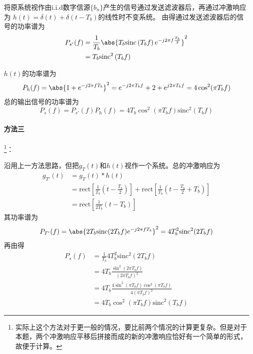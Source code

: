     将原系统视作由i.i.d数字信源$\{b_n\}$产生的信号通过发送滤波器后，再通过冲激响应为
    $h(t)=\delta(t)+\delta(t-T_b)$的线性时不变系统。
    由得通过发送滤波器后的信号的功率谱为
    \begin{equation}
        \begin{split}
            P_{s'}(f)   &=\frac{1}{T_b}\abs{T_b\text{sinc}\left(T_bf\right)e^{-j2\pi f\frac{T_b}{2}}}^2\\
                        &=T_b\text{sinc}^2\left(T_bf\right)
        \end{split}
    \end{equation}

    $h(t)$的功率谱为
    \begin{equation}
        P_h(f)=\abs{1+e^{-j2\pi fT_b}}^2=e^{-j2\pi T_bf}+2+e^{j2\pi T_bf}=4\cos^2(\pi T_bf)
    \end{equation}
    总的输出信号的功率谱为
    \begin{equation}
        P_s(f)=P_{s'}(f)P_h(f)=4T_b\cos^2(\pi T_bf)\text{sinc}^2\left(T_bf\right)
    \end{equation}

    \paragraph{方法三}\footnote{实际上这个方法对于更一般的情况，要比前两个情况的计算更复杂。但是对于本题，两个冲激响应平移后拼接而成的新的冲激响应恰好有一个简单的形式，故便于计算。}：

    沿用上一方法思路，但把$g_T(t)$和$h(t)$视作一个系统。总的冲激响应为
    \begin{equation}
        \begin{split}
            g_{T'}(t)&=g_T(t)*h(t)\\
                     &=\text{rect}\left[\frac{1}{T_b}(t-\frac{T_b}{2})\right]+\text{rect}\left[\frac{1}{T_b}(t-\frac{T_b}{2}+T_b)\right]\\
                     &=\text{rect}\left[\frac{1}{2T_b}(t-T_b)\right]
        \end{split}
    \end{equation}
    其功率谱为
    \begin{equation}
        P_{T'}(f)=\abs{2T_b\text{sinc}(2T_bf)e^{-j2\pi fT_b}}^2=4T_b^2\text{sinc}^2(2T_bf)
    \end{equation}
    再由得
    \begin{equation}
        \begin{split}
            P_s(f)  &=\frac{1}{T_b}4T_b^2\text{sinc}^2(2T_bf)\\
                    &=4T_b\frac{\sin^2(2\pi T_bf)}{(2\pi T_bf)^2}\\
                    &=4T_b\frac{4\sin^2(\pi T_bf)\cos^2(\pi T_bf)}{4(\pi T_bf)^2}\\
                    &=4T_b\cos^2(\pi T_bf)\text{sinc}^2\left(T_bf\right)
        \end{split}
    \end{equation}

